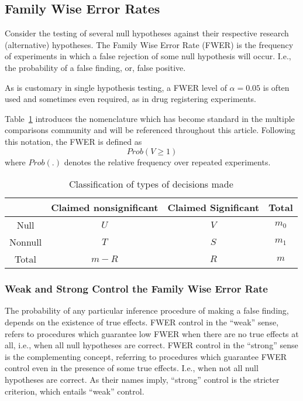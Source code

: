 \documentclass[review,12pt]{article}
\begin{document}
\subsection{Family Wise Error Rates}
Consider the testing of several null hypotheses against their respective research (alternative) hypotheses. The Family Wise Error Rate (FWER) is the frequency of experiments in which a false rejection of some null hypothesis will occur. I.e., the probability of a false finding, or, false positive.

As is customary in single hypothesis testing, a FWER level of $\alpha=0.05$ is often used and sometimes even required, as in drug registering experiments.




Table~\ref{tab:event_notation} introduces the nomenclature which has become standard in the multiple comparisons community and will be referenced throughout this article. Following this notation, the FWER is defined as $$Prob(V \geq 1 )$$ where $Prob(.)$ denotes the relative frequency over repeated experiments.



\begin{table}[h]
  \centering
\begin{tabular}{|c|c|c|c|}
\hline \rule[-1ex]{0pt}{1.5ex} & Claimed nonsignificant & Claimed Significant & Total \\ 
\hline
\hline \rule[-1ex]{0pt}{1.5ex} Null & $U$ & $V$ & $m_0$ \\ 
\hline \rule[-1ex]{0pt}{1.5ex} Nonnull & $T$ & $S$ & $m_1$ \\ 
\hline \rule[-1ex]{0pt}{1.5ex} Total & $m-R$ & $R$ & $m$ \\ 
\hline 
\end{tabular} 
  \caption{Classification of types of decisions made}
  \label{tab:event_notation}
\end{table}


\subsubsection{Weak and Strong Control the Family Wise Error Rate}
The probability of any particular inference procedure of making a false finding, depends on the existence of true effects. FWER control in the ``weak'' sense, refers to procedures which guarantee low FWER when there are no true effects at all, i.e., when all null hypotheses are correct. 
FWER control in the ``strong'' sense is the complementing concept, referring to procedures which guarantee FWER control even in the presence of some true effects. I.e., when not all null hypotheses are correct. 
As their names imply, ``strong'' control is the stricter criterion, which entails ``weak'' control.
\end{document}
